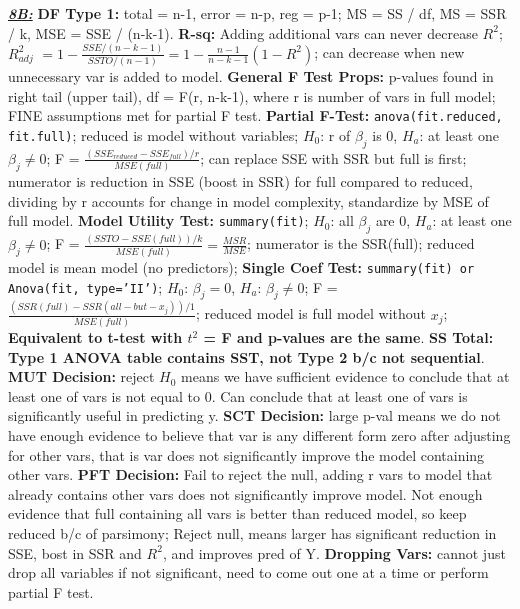 \documentclass[8pt]{extarticle}
\begin{document}
\textit{\textbf{\underline{8B:}}}
\textbf{DF Type 1:} total = n-1, error = n-p, reg = p-1; MS = SS / df,
MS = SSR / k, MSE = SSE / (n-k-1).
\textbf{R-sq:} Adding additional vars can never decrease $R^2$; $R^2_{adj}$ 
$ = 1 - \frac{SSE/(n-k-1)}{SSTO/(n-1)} = 1 - \frac{n-1}{n-k-1}(1-R^2)$; can 
decrease when new unnecessary var is added to model.
\textbf{General F Test Props:} p-values found in right tail (upper tail), df = 
F(r, n-k-1), where r is number of vars in full model; FINE assumptions met for 
partial F test.
\textbf{Partial F-Test:} \texttt{anova(fit.reduced, fit.full)}; reduced is model
without variables; $H_0$: r of $\beta_j$ is 0, $H_a$: at least one $\beta_j \neq 
0$; F = $\frac{(SSE_{reduced} - SSE_{full})/r}
{MSE(full)}$; can replace SSE with SSR but full is first; numerator is reduction 
in SSE (boost in SSR) for full compared to reduced, dividing by r accounts for 
change in model complexity, standardize by MSE of full model.
\textbf{Model Utility Test:} \texttt{summary(fit)}; $H_0$: all $\beta_j$ are 0,
$H_a$: at least one $\beta_j \neq 0$; F = $\frac{(SSTO - SSE(full))
/k}{MSE(full)} = \frac{MSR}{MSE}$; numerator is the SSR(full); reduced model is 
mean model (no predictors);
\textbf{Single Coef Test:} \texttt{summary(fit) or Anova(fit, type='II')}; 
$H_0$: $\beta_j = 0$, $H_a$: $\beta_j \neq 0$; F = 
$\frac{(SSR(full) - SSR(all-but-x_j))/1}{MSE(full)}$; reduced model is full 
model without $x_j$; \textbf{Equivalent to t-test with $t^2$ = F and 
p-values are the same}.
\textbf{SS Total: Type 1 ANOVA table contains SST, not Type 2 b/c not 
sequential}.
\textbf{MUT Decision:} reject $H_0$ means we have sufficient evidence to conclude 
that at least one of vars is not equal to 0. Can conclude that at least one of 
vars is significantly useful in predicting y.
\textbf{SCT Decision:} large p-val means we do not have enough evidence to 
believe that var is any different form zero after adjusting for other vars, 
that is var does not significantly improve the model containing other vars.
\textbf{PFT Decision:} Fail to reject the null, adding r vars to model that already 
contains other vars does not significantly improve model. Not enough evidence 
that full containing all vars is better than reduced model, so keep reduced 
b/c of parsimony; Reject null, means larger has significant reduction in SSE, 
bost in SSR and $R^2$, and improves pred of Y.
\textbf{Dropping Vars:} cannot just drop all variables if not significant, need 
to come out one at a time or perform partial F test.\\
\end{document}
